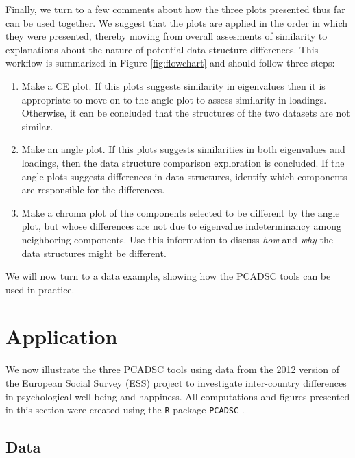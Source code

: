 \documentclass[]{interact}
\theoremstyle{plain}%
\theoremstyle{definition}
\theoremstyle{remark}
\newcommand{\R}[1]{\texttt{#1}}
\begin{document}
Finally, we turn to a few comments about how the three plots presented thus far can be used together. We suggest that the plots are applied in the  order in which they were presented, thereby moving from overall assesments of similarity to explanations about the nature of potential data structure differences. This workflow is summarized in Figure \ref{fig:flowchart} and should follow three steps:
\begin{enumerate}
\item Make a CE plot. If this plots suggests similarity in eigenvalues then it is appropriate to move on to the angle plot to assess similarity in loadings. Otherwise, it can be concluded that the structures of the two datasets are not similar. 
\item Make an angle plot. If this plots suggests similarities in both eigenvalues and loadings, then the data structure comparison exploration is concluded. If the angle plots suggests differences in data structures, identify which components are responsible for the differences. 
\item Make a chroma plot of the components selected to be different by the angle plot, but whose differences are not due to eigenvalue indeterminancy among neighboring components. Use this information to discuss \textit{how} and \textit{why} the data structures might be different. 
\end{enumerate}
We will now turn to a data example, showing how the PCADSC tools can be used in practice.


\section{Application}\label{sec:dataexample}

We now illustrate the three PCADSC tools using data from the 2012 version of the European Social Survey (ESS) project to investigate inter-country differences in psychological well-being and happiness. All computations and figures presented in this section were created using the \R{R} package \R{PCADSC} \cite{PCADSC}.


\subsection{Data}
\end{document}
